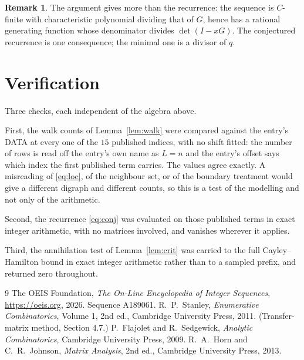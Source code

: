\documentclass[11pt,a4paper]{article}
\theoremstyle{plain}
\theoremstyle{definition}
\newtheorem{remark}[theorem]{Remark}
\begin{document}
\begin{remark}
The argument gives more than the recurrence: the sequence is $C$-finite with characteristic
polynomial dividing that of $G$, hence has a rational generating function whose denominator
divides $\det(I-xG)$. The conjectured recurrence is one consequence; the minimal one is a
divisor of $q$.
\end{remark}

\section{Verification}

Three checks, each independent of the algebra above.

First, the walk counts of Lemma~\ref{lem:walk} were compared against the entry's DATA at
every one of the $15$ published indices, with no shift fitted: the number of rows is
read off the entry's own name as $L=n$ and the entry's offset says which index the first
published term carries. The values agree exactly. A misreading of \eqref{eq:loc}, of the
neighbour set, or of the boundary treatment would give a different digraph and different
counts, so this is a test of the modelling and not only of the arithmetic.

Second, the recurrence \eqref{eq:conj} was evaluated on those published terms in exact
integer arithmetic, with no matrices involved, and vanishes wherever it applies.

Third, the annihilation test of Lemma~\ref{lem:crit} was carried to the full
Cayley--Hamilton bound in exact integer arithmetic rather than to a sampled prefix, and
returned zero throughout.

\begin{thebibliography}{9}
 The OEIS Foundation, \emph{The On-Line Encyclopedia of Integer
Sequences}, \url{https://oeis.org}, 2026. Sequence A189061.
 R.~P.~Stanley, \emph{Enumerative Combinatorics}, Volume 1, 2nd ed.,
Cambridge University Press, 2011. (Transfer-matrix method, Section 4.7.)
 P.~Flajolet and R.~Sedgewick, \emph{Analytic Combinatorics}, Cambridge
University Press, 2009.
 R.~A.~Horn and C.~R.~Johnson, \emph{Matrix Analysis}, 2nd ed., Cambridge
University Press, 2013.
\end{thebibliography}
\end{document}
